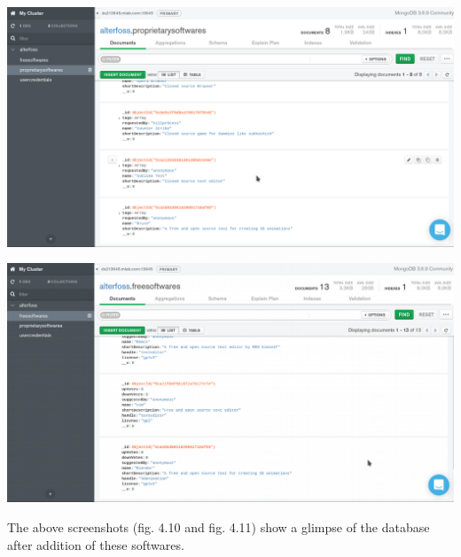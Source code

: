\subsubsection{}


\begin{center}
\includegraphics[scale=0.47]{images/4-8.png}
\end{center}



\begin{center}
\includegraphics[scale=0.5]{images/4-9.png}
\end{center}

The above screenshots (fig. 4.10 and fig. 4.11) show a glimpse of the database after addition of these softwares.

























